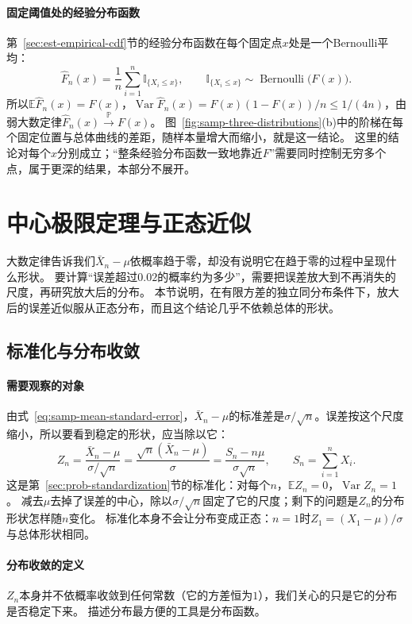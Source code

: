 \paragraph{固定阈值处的经验分布函数}
第~\ref{sec:est-empirical-cdf}节的经验分布函数在每个固定点$x$处是一个Bernoulli平均：
\[
  \hat F_n(x)=\frac1n\sum_{i=1}^n\mathbb{I}_{\{X_i\leq x\}},\qquad \mathbb{I}_{\{X_i\leq x\}}\sim\operatorname{Bernoulli}\bigl(F(x)\bigr).
\]
所以$\mathbb{E}\hat F_n(x)=F(x)$，$\operatorname{Var}\hat F_n(x)=F(x)(1-F(x))/n\leq1/(4n)$，由弱大数定律$\hat F_n(x)\xrightarrow{\mathbb{P}}F(x)$。
图~\ref{fig:samp-three-distributions}(b)中的阶梯在每个固定位置与总体曲线的差距，随样本量增大而缩小，就是这一结论。
这里的结论对每个$x$分别成立；“整条经验分布函数一致地靠近$F$”需要同时控制无穷多个点，属于更深的结果，本部分不展开。

\section{中心极限定理与正态近似}
\label{sec:samp-clt}

大数定律告诉我们$\bar X_n-\mu$依概率趋于零，却没有说明它在趋于零的过程中呈现什么形状。
要计算“误差超过$0.02$的概率约为多少”，需要把误差放大到不再消失的尺度，再研究放大后的分布。
本节说明，在有限方差的独立同分布条件下，放大后的误差近似服从正态分布，而且这个结论几乎不依赖总体的形状。

\subsection{标准化与分布收敛}

\paragraph{需要观察的对象}
由式~\eqref{eq:samp-mean-standard-error}，$\bar X_n-\mu$的标准差是$\sigma/\sqrt n$。误差按这个尺度缩小，所以要看到稳定的形状，应当除以它：
\begin{equation}
  Z_n=\frac{\bar X_n-\mu}{\sigma/\sqrt n}=\frac{\sqrt n(\bar X_n-\mu)}{\sigma}=\frac{S_n-n\mu}{\sigma\sqrt n},\qquad S_n=\sum_{i=1}^nX_i.
  \label{eq:samp-standardized-mean}
\end{equation}
这是第~\ref{sec:prob-standardization}节的标准化：对每个$n$，$\mathbb{E}Z_n=0$，$\operatorname{Var}Z_n=1$。
减去$\mu$去掉了误差的中心，除以$\sigma/\sqrt n$固定了它的尺度；剩下的问题是$Z_n$的分布形状怎样随$n$变化。
标准化本身不会让分布变成正态：$n=1$时$Z_1=(X_1-\mu)/\sigma$与总体形状相同。

\paragraph{分布收敛的定义}
$Z_n$本身并不依概率收敛到任何常数（它的方差恒为$1$），我们关心的只是它的分布是否稳定下来。
描述分布最方便的工具是分布函数。

